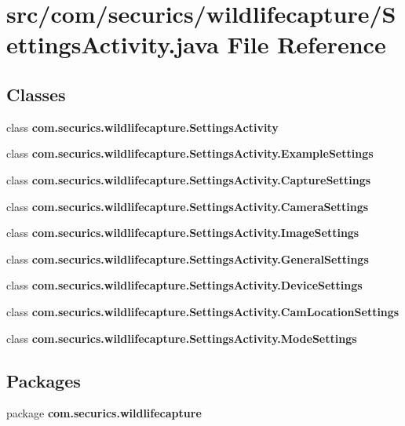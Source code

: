 \section{src/com/securics/wildlifecapture/\+Settings\+Activity.java File Reference}
\label{_settings_activity_8java}
\subsection*{Classes}
\begin{DoxyCompactItemize}
\item 
class {\bf com.\+securics.\+wildlifecapture.\+Settings\+Activity}
\item 
class {\bfseries com.\+securics.\+wildlifecapture.\+Settings\+Activity.\+Example\+Settings}
\item 
class {\bfseries com.\+securics.\+wildlifecapture.\+Settings\+Activity.\+Capture\+Settings}
\item 
class {\bfseries com.\+securics.\+wildlifecapture.\+Settings\+Activity.\+Camera\+Settings}
\item 
class {\bfseries com.\+securics.\+wildlifecapture.\+Settings\+Activity.\+Image\+Settings}
\item 
class {\bfseries com.\+securics.\+wildlifecapture.\+Settings\+Activity.\+General\+Settings}
\item 
class {\bfseries com.\+securics.\+wildlifecapture.\+Settings\+Activity.\+Device\+Settings}
\item 
class {\bfseries com.\+securics.\+wildlifecapture.\+Settings\+Activity.\+Cam\+Location\+Settings}
\item 
class {\bfseries com.\+securics.\+wildlifecapture.\+Settings\+Activity.\+Mode\+Settings}
\end{DoxyCompactItemize}
\subsection*{Packages}
\begin{DoxyCompactItemize}
\item 
package {\bf com.\+securics.\+wildlifecapture}
\end{DoxyCompactItemize}
